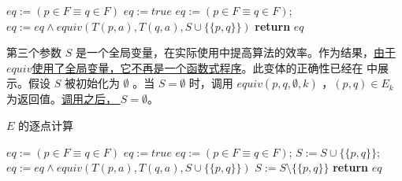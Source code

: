 \begin{algorithm}
    \small
    \begin{algorithmic}[1]
                $ eq := ( p \in F \equiv q \in F ) $
                $eq := true$
                \State $ eq := ( p \in F \equiv q \in F ) $;
                    \State $eq:= eq \land equiv ( T(p,a),T(q,a),S\cup \{ \{ p,q\} \}  ) $
                \EndFor
            \EndIf
            \State \textbf{return} $eq$
        \EndFunction
    \end{algorithmic}
\end{algorithm}
第三个参数 $S$ 是一个全局变量，在实际使用中提高算法的效率。作为结果，\underline{由于$equiv$使用了全局变量，它不再是一个函数式程序}。此变体的正确性已经在 \cite{t-Ei91} 中展示。假设 $S$ 被初始化为 $\emptyset$ 。当 $ S =\emptyset $ 时，调用 $equiv(p,q,\emptyset,k)$ ，$ (p,q) \in E_k $ 为返回值。\underline{调用之后， $S = \emptyset$}。
\begin{algorithm}
    \caption{$E$ 的逐点计算}\label{al:4-9}
    \small
    \begin{algorithmic}[1]
                $ eq := ( p \in F \equiv q \in F ) $
                $eq := true$
                \State $ eq := ( p \in F \equiv q \in F ) $;
                \State $S:=S \cup \{  \{ p,q \} \}$;
                    \State $eq:= eq \land equiv ( T(p,a),T(q,a),S\cup \{ \{ p,q\} \}  ) $
                \EndFor
                \State $S:=S \setminus \{  \{ p,q \} \}$
            \EndIf
            \State \textbf{return} $eq$
        \EndFunction
    \end{algorithmic}
\end{algorithm}

